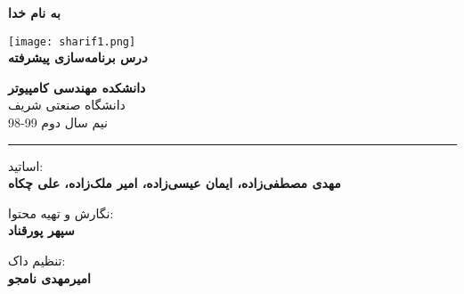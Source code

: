 \documentclass[]{article}
\begin{document}
\begin{titlepage}
\begin{center}

\textbf{ \Huge{به نام خدا} }
        
\vspace{0.2cm}

\texttt{[image: sharif1.png]}\\
\vspace{0.2cm}
\textbf{ \Huge{\emph درس برنامه‌سازی پیشرفته} }\\
\vspace{0.25cm}
\textbf{ \Large{} }
\vspace{0.2cm}
       
 
      \large \textbf{دانشکده مهندسی کامپیوتر}\\\vspace{0.1cm}
    \large   دانشگاه صنعتی شریف\\\vspace{0.2cm}
       \large   ﻧﯿﻢ سال دوم 99-98 \\\vspace{0.10cm}
      \noindent\rule[1ex]{\linewidth}{1pt}
اساتید:\\
    \textbf{{مهدی مصطفی‌زاده، ایمان عیسی‌زاده، امیر ملک‌زاده، علی چکاه}}



        \vspace{0.10cm}
نگارش و تهیه محتوا:\\
    \textbf{{سپهر پورقناد}}
    
       \vspace{0.10cm}
       تنظیم داک:\\
    \textbf{{امیرمهدی نامجو}}

    
        \vspace{0.05cm}

\end{center}
\end{titlepage}


\newpage
\pagestyle{fancy}
\fancyhf{}
\fancyfoot{}
\cfoot{\thepage}
\renewcommand{\headrulewidth}{2pt}

\KashidaOff


 \Large \textbf{\\
}
\end{document}
